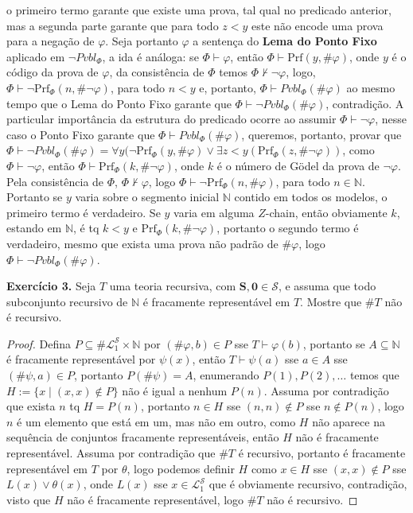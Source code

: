\documentclass[11pt]{article}
\newcommand{\mc}[1]{\mathcal{#1}}
\newcommand{\mbb}[1]{\mathbb{#1}}
\begin{document}
\begin{shaded}
o primeiro termo garante que existe uma prova, tal qual no predicado anterior, mas a segunda parte garante que para todo $z<y$ este não encode uma prova para a negação de $\varphi$. Seja portanto $\varphi$ a sentença do \textbf{Lema do Ponto Fixo} aplicado em $\neg Pvbl_\Phi$, a ida é análoga: se $\Phi\vdash\varphi$, então $\Phi\vdash\text{Prf}(y,\#\varphi)$, onde $y$ é o código da prova de $\varphi$, da consistência de $\Phi$ temos $\Phi\nvdash\neg\varphi$, logo, $\Phi\vdash\neg\text{Prf}_\Phi(n,\#\neg\varphi)$, para todo $n<y$ e, portanto, $\Phi\vdash Pvbl_\Phi(\#\varphi)$ ao mesmo tempo que o Lema do Ponto Fixo garante que $\Phi\vdash\neg Pvbl_\Phi(\#\varphi)$, contradição. A particular importância da estrutura do predicado ocorre ao assumir $\Phi\vdash\neg\varphi$, nesse caso o Ponto Fixo garante que $\Phi\vdash Pvbl_\Phi(\#\varphi)$, queremos, portanto, provar que $\Phi\vdash\neg Pvbl_\Phi(\#\varphi)=\forall y(\neg\text{Prf}_\Phi(y,\#\varphi)\vee\exists z<y(\text{Prf}_\Phi(z,\#\neg\varphi))$,  como $\Phi\vdash\neg\varphi$, então $\Phi\vdash\text{Prf}_\Phi(k,\#\neg\varphi)$, onde $k$ é o número de Gödel da prova de $\neg\varphi$. Pela consistência de $\Phi$, $\Phi\nvdash\varphi$, logo $\Phi\vdash\neg\text{Prf}_\Phi(n,\#\varphi)$, para todo $n\in\mbb{N}$. Portanto se $y$ varia sobre o segmento inicial $\mbb{N}$ contido em todos os modelos, o primeiro termo é verdadeiro. Se $y$ varia em alguma $Z$-chain, então obviamente $k$, estando em $\mbb{N}$, é tq $k<y$ e $\text{Prf}_\Phi(k,\#\neg\varphi)$, portanto o segundo termo é verdadeiro, mesmo que exista uma prova não padrão de $\#\varphi$, logo $\Phi\vdash\neg Pvbl_\Phi(\#\varphi)$.
\end{shaded}

\begin{shaded}
\textbf{Exercício 3.} Seja $T$ uma teoria recursiva, com $\mathbf{S,0}\in\mc{S}$, e assuma que todo subconjunto recursivo de $\mbb{N}$ é fracamente representável em $T$. Mostre que $\#T$ não é recursivo.
\end{shaded}

\begin{proof}
    Defina $P\subseteq\#\mc{L}_1^\mc{S}\times\mbb{N}$ por $(\#\varphi,b)\in P$ sse $T\vdash\varphi(b)$, portanto se $A\subseteq\mbb{N}$ é fracamente representável por $\psi(x)$, então $T\vdash\psi(a)$ sse $a\in A$ sse $(\#\psi,a)\in P$, portanto $P(\#\psi)=A$, enumerando $P(1),P(2),\dots$ temos que $H:=\{x\mid (x,x)\notin P\}$ não é igual a nenhum $P(n)$. Assuma por contradição que exista $n$ tq $H=P(n)$, portanto $n\in H$ sse $(n,n)\notin P$ sse $n\notin P(n)$, logo $n$ é um elemento que está em um, mas não em outro, como $H$ não aparece na sequência de conjuntos fracamente representáveis, então $H$ não é fracamente representável. Assuma por contradição que $\#T$ é recursivo, portanto é fracamente representável em $T$ por $\theta$, logo podemos definir $H$ como $x\in H$ sse $(x,x)\notin P$ sse $L(x)\vee \theta(x)$, onde $L(x)$ sse $x\in\mc{L}_1^\mc{S}$ que é obviamente recursivo, contradição, visto que $H$ não é fracamente representável, logo $\#T$ não é recursivo.
\end{proof}
\end{document}
